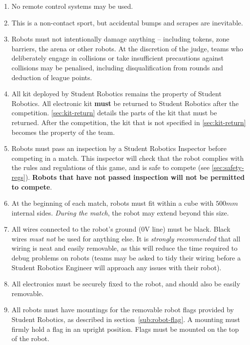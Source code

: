 \begin{enumerate}
\item No remote control systems may be used.
\item This is a non-contact sport, but accidental bumps and scrapes are inevitable.
\item Robots must not intentionally damage anything -- including tokens, zone barriers, the arena or other robots.
      At the discretion of the judge, teams who deliberately engage in collisions or take insufficient precautions against collisions may be penalised, including disqualification from rounds and deduction of league points.
\item All kit deployed by Student Robotics remains the property of Student Robotics.
      All electronic kit \textbf{must} be returned to Student Robotics after the competition.
      \autoref{sec:kit-return} details the parts of the kit that must be returned.
      After the competition, the kit that is not specified in \autoref{sec:kit-return} becomes the property of the team.


\item Robots must pass an inspection by a Student Robotics Inspector before competing in a match.
      This inspector will check that the robot complies with the rules and regulations of this game, and is safe to compete (see \autoref{sec:safety-regs}).
      \textbf{Robots that have not passed inspection will not be permitted to compete}.

\item At the beginning of each match, robots must fit within a cube with $500mm$ internal sides.
      \textit{During the match}, the robot may extend beyond this size.

\item All wires connected to the robot's ground (0V line) must be black.
      Black wires \emph{must not} be used for anything else.
      It is \emph{strongly recommended} that all wiring is neat and easily removable, as this will reduce the time required to debug problems on robots
       (teams may be asked to tidy their wiring before a Student Robotics Engineer will approach any issues with their robot).

\item All electronics must be securely fixed to the robot, and should also be easily removable.

\item All robots must have mountings for the removable robot flags
      provided by Student Robotics, as described in section~\ref{sub:robot-flag}. A mounting
      must firmly hold a flag in an upright position. Flags must be mounted on the top of the robot.


\end{enumerate}
